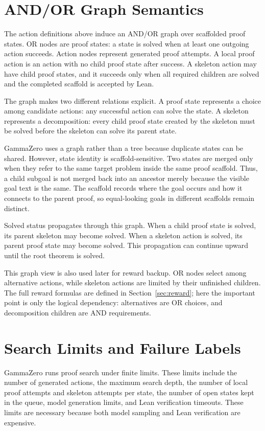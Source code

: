 \section{AND/OR Graph Semantics}

The action definitions above induce an AND/OR graph over scaffolded proof states. OR nodes are proof states: a state is solved when at least one outgoing action succeeds. Action nodes represent generated proof attempts. A local proof action is an action with no child proof state after success. A skeleton action may have child proof states, and it succeeds only when all required children are solved and the completed scaffold is accepted by Lean.

The graph makes two different relations explicit. A proof state represents a choice among candidate actions: any successful action can solve the state. A skeleton represents a decomposition: every child proof state created by the skeleton must be solved before the skeleton can solve its parent state.

GammaZero uses a graph rather than a tree because duplicate states can be shared. However, state identity is scaffold-sensitive. Two states are merged only when they refer to the same target problem inside the same proof scaffold. Thus, a child subgoal is not merged back into an ancestor merely because the visible goal text is the same. The scaffold records where the goal occurs and how it connects to the parent proof, so equal-looking goals in different scaffolds remain distinct.

Solved status propagates through this graph. When a child proof state is solved, its parent skeleton may become solved. When a skeleton action is solved, its parent proof state may become solved. This propagation can continue upward until the root theorem is solved.

This graph view is also used later for reward backup. OR nodes select among alternative actions, while skeleton actions are limited by their unfinished children. The full reward formulas are defined in Section~\ref{sec:reward}; here the important point is only the logical dependency: alternatives are OR choices, and decomposition children are AND requirements.

\section{Search Limits and Failure Labels}

GammaZero runs proof search under finite limits. These limits include the number of generated actions, the maximum search depth, the number of local proof attempts and skeleton attempts per state, the number of open states kept in the queue, model generation limits, and Lean verification timeouts. These limits are necessary because both model sampling and Lean verification are expensive.

